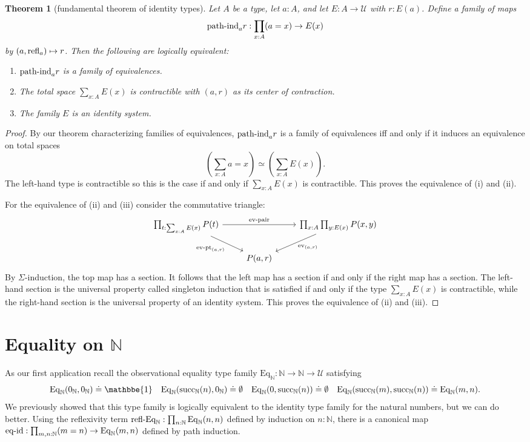 \documentclass{amsart}
\theoremstyle{theorem}
\newtheorem*{thm}{Theorem}
\theoremstyle{definition}
\theoremstyle{remark}
\newcommand{\0}{\mathbbe{0}}
\newcommand{\1}{\mathbbe{1}}
\newcommand{\2}{\mathbbe{2}}
\newcommand{\3}{\mathbbe{3}}
\newcommand{\4}{\mathbbe{4}}
\newcommand{\term}[1]{{\textup{#1}}}
\newcommand{\bN}{{\mathbb{N}}}
\newcommand{\suc}{\term{succ}_{\bN}}
\newcommand{\refl}{\term{refl}}
\newcommand{\UU}{{\mathcal{U}}}
\newcommand{\Eq}{\mathrm{Eq}}
\newcommand{\ev}{\term{ev}}
\begin{document}
\begin{thm}[fundamental theorem of identity types] Let $A$ be a type, let $a :A$, and let $E : A \to \UU$ with $r : E(a)$. Define a family of maps  \[ \term{path-ind}_a r : \prod_{x:A}(a=x) \to E(x)\] by $(a,\refl_a) \mapsto r$. Then the following are logically equivalent:
\begin{enumerate}
\item $\term{path-ind}_ar$ is a family of equivalences.
\item The total space $\sum_{x:A}E(x)$ is contractible with $(a,r)$ as its center of contraction.
\item The family $E$ is an identity system.
\end{enumerate}
\end{thm}
\begin{proof}
By our theorem characterizing families of equivalences, $\term{path-ind}_ar$ is a family of equivalences iff and only if it induces an equivalence on total spaces
\[ \left(\sum_{x:A}a=x \right) \simeq \left(\sum_{x:A}E(x)\right).\]
The left-hand type is contractible so this is the case if and only if $\sum_{x:A}E(x)$ is contractible. This proves the equivalence of (i) and (ii).

For the equivalence of (ii) and (iii) consider the commutative triangle:
\[
\begin{tikzcd} \prod_{t : \sum_{x:A}E(x)} P(t) \arrow[rr, "\term{ev-pair}"] \arrow[dr, "\term{ev-pt}_{(a,r)}"'] & & \prod_{x:A} \prod_{y : E(x)} P(x,y) \arrow[dl, "\ev_{(a,r)}"] \\ & P(a,r)
\end{tikzcd}
\]
By $\Sigma$-induction, the top map has a section. It follows that the left map has a section if and only if the right map has a section. The left-hand section is the universal property called singleton induction that is satisfied if and only if the type $\sum_{x:A}E(x)$ is contractible, while the right-hand section is the universal property of an identity system. This proves the equivalence of  (ii) and (iii).
\end{proof}

\section*{Equality on \texorpdfstring{$\bN$}{N}}

As our first application recall the observational equality type family $\Eq_\bN : \bN \to \bN \to \UU$ satisfying
\[ \Eq_\bN(0_\bN,0_\bN) \doteq \1 \quad \Eq_\bN(\suc(n),0_\bN) \doteq \emptyset \quad \Eq_\bN(0,\suc(n)) \doteq \emptyset \quad \Eq_\bN(\suc(m), \suc(n)) \doteq \Eq_\bN(m,n).\] We previously showed that this type family is logically equivalent to the identity type family for the natural numbers, but we can do better. Using the reflexivity term $\term{refl-Eq}_\bN : \prod_{n :\bN} \Eq_{\bN}(n,n)$ defined by induction on $n : \bN$, there is a canonical map $\term{eq-id} : \prod_{m, n : \bN} (m=n) \to \Eq_\bN(m,n)$ defined by path induction.
\end{document}
